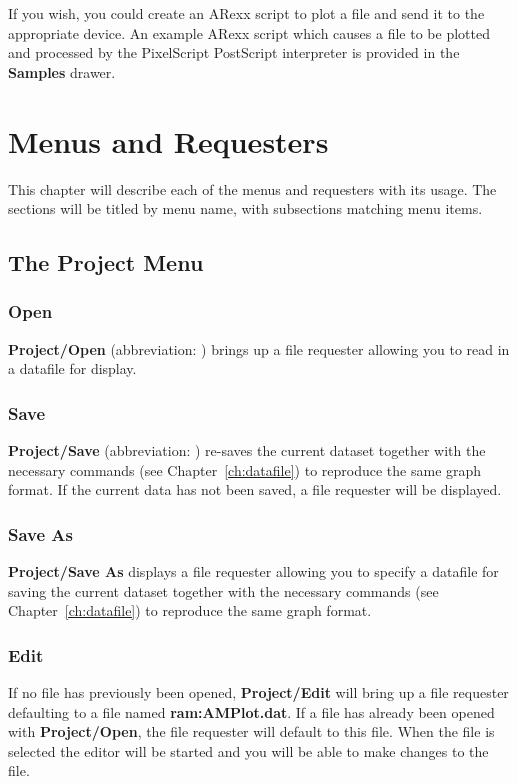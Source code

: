 If you wish, you could create an ARexx script to plot a 
file and send it to the 
appropriate device. An example ARexx script which causes a file to be plotted and 
processed by the PixelScript PostScript interpreter is provided in the {\bf Samples} 
drawer.












\chapter{Menus and Requesters}
\label{ch:menus}
This chapter will describe each of the menus and requesters with its usage. The 
sections will be titled by menu name, with subsections matching menu items.
\section{The Project Menu}
\subsection{Open}
{\bf Project/Open} (abbreviation: ) brings up a file requester 
allowing you to read in a datafile for display.
\subsection{Save}
{\bf Project/Save} (abbreviation: ) re-saves the current dataset 
together with the necessary commands (see Chapter~\ref{ch:datafile}) to reproduce 
the same graph format. If the current data has not been saved, a file requester will 
be displayed.
\subsection{Save As}
{\bf Project/Save As} displays a file requester allowing you to specify
 a datafile for 
saving the current dataset together with the necessary commands (see 
Chapter~\ref{ch:datafile}) to reproduce the same graph format.

\subsection{Edit}
\label{sec:edit}
If no file has previously been opened, {\bf Project/Edit} will bring up 
a file 
requester defaulting to a file named {\bf ram:AMPlot.dat}. If a file has already been 
opened with {\bf Project/Open}, the file requester will default to this file. 
When the file is selected the editor will be started and you will be able to make 
changes to the file. 

